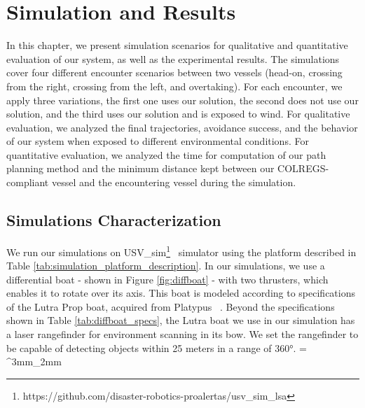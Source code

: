 \chapter{Simulation and Results}
\label{chap:5_Simulation_And_Results}
        
    In this chapter, we present simulation scenarios for qualitative and quantitative evaluation of our system, as well as the experimental results. The simulations cover four different encounter scenarios between two vessels (head-on, crossing from the right, crossing from the left, and overtaking). For each encounter, we apply three variations, the first one uses our solution, the second does not use our solution, and the third uses our solution and is exposed to wind. For qualitative evaluation, we analyzed the final trajectories, avoidance success, and the behavior of our system when exposed to different environmental conditions. For quantitative evaluation, we analyzed the time for computation of our path planning method and the minimum distance kept between our \ac{COLREGS}-compliant vessel and the encountering vessel during the simulation.

    \section{Simulations Characterization}
    
    We run our simulations on USV\_sim\footnote{https://github.com/disaster-robotics-proalertas/usv\_sim\_lsa}~\cite{Paravisi2018Toward} simulator using the platform described in Table \ref{tab:simulation_platform_description}. In our simulations, we use a differential boat - shown in Figure \ref{fig:diffboat} - with two thrusters, which enables it to rotate over its axis. This boat is modeled according to specifications of the Lutra Prop boat, acquired from Platypus ~\cite{PlatypusLLC}. Beyond the specifications shown in Table \ref{tab:diffboat_specs}, the Lutra boat we use in our simulation has a laser rangefinder for environment scanning in its bow. We set the rangefinder to be capable of detecting objects within 25 meters in a range of 360°.
    \tabulinesep = ^3mm_2mm
    \everyrow{\tabucline[.4mm  white]{}}

